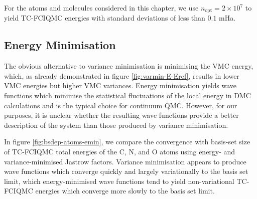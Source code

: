For the atoms and molecules considered in this chapter, we use $n_\mathrm{opt}=2\times 10^7$ to yield TC-FCIQMC energies with standard deviations of less than $0.1$ mHa.

\subsection{Energy Minimisation}

The obvious alternative to variance minimisation is minimising the VMC energy, which, as already demonstrated in figure \ref{fig:varmin-E-Eref}, results in lower VMC energies but higher VMC variances.
Energy minimisation yields wave functions which minimise the statistical fluctuations of the local energy in DMC calculations and is the typical choice for continuum QMC. However, for our purposes, it is unclear whether the resulting wave functions provide a better description of the system than those produced by variance minimisation.

In figure \ref{fig:bsdep-atoms-emin}, we compare the convergence with basis-set size of TC-FCIQMC total energies of the C, N, and O atoms using energy- and variance-minimised Jastrow factors. Variance minimisation appears to produce wave functions which converge quickly and largely variationally to the basis set limit, which energy-minimised wave functions tend to yield non-variational TC-FCIQMC energies which converge more slowly to the basis set limit.

